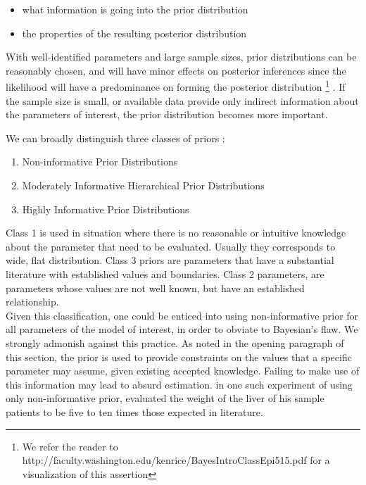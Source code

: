 \documentclass[letterpaper]{article}
\begin{document}
\begin{itemize}
\item what  information  is  going  into  the  prior  distribution
\item the  properties  of  the  resulting  posterior  distribution
\end{itemize}

With well-identified parameters and large sample sizes,  prior  distributions can be reasonably chosen, and will have minor effects on posterior inferences since the likelihood will have a predominance on forming the posterior distribution \footnote{ We refer the reader to http://faculty.washington.edu/kenrice/BayesIntroClassEpi515.pdf for a visualization of this assertion} \cite{gelman2002}. If the sample size is small, or available data provide only indirect information about the parameters of interest,  the  prior  distribution  becomes  more  important.

We can broadly distinguish three classes of priors \cite{gelman2002}:

\begin{enumerate}
\item Non-informative Prior Distributions
\item Moderately Informative Hierarchical Prior
Distributions
\item Highly Informative Prior Distributions
\end{enumerate}

Class 1 is used in situation where there is no reasonable or intuitive knowledge about the parameter that need to be evaluated. Usually they corresponds to wide, flat distribution. Class 3 priors are parameters that have a substantial literature with established values and boundaries. Class 2 parameters, are parameters whose values are not well known, but have an established relationship. \\
\indent Given this classification, one could be enticed into using non-informative prior for all parameters of the model of interest, in order to obviate to Bayesian's flaw. We strongly admonish against this practice. As noted in the opening paragraph of this section, the prior is used to provide constraints on the values that a specific parameter may assume, given existing accepted knowledge. Failing to make use of this information may lead to absurd estimation. \citet{gelman2002} in one such experiment of using only non-informative prior, evaluated the weight of the liver of his sample patients to be five to ten times those expected in literature.
\end{document}
